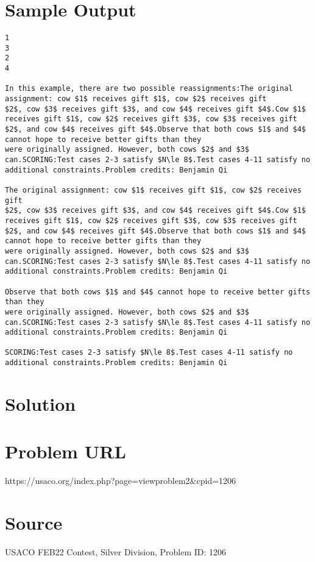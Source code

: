 \documentclass[12pt]{article}
\begin{document}
\section*{Sample Output}
\begin{verbatim}
1
3
2
4

In this example, there are two possible reassignments:The original assignment: cow $1$ receives gift $1$, cow $2$ receives gift
$2$, cow $3$ receives gift $3$, and cow $4$ receives gift $4$.Cow $1$ receives gift $1$, cow $2$ receives gift $3$, cow $3$ receives gift
$2$, and cow $4$ receives gift $4$.Observe that both cows $1$ and $4$ cannot hope to receive better gifts than they
were originally assigned. However, both cows $2$ and $3$ can.SCORING:Test cases 2-3 satisfy $N\le 8$.Test cases 4-11 satisfy no additional constraints.Problem credits: Benjamin Qi

The original assignment: cow $1$ receives gift $1$, cow $2$ receives gift
$2$, cow $3$ receives gift $3$, and cow $4$ receives gift $4$.Cow $1$ receives gift $1$, cow $2$ receives gift $3$, cow $3$ receives gift
$2$, and cow $4$ receives gift $4$.Observe that both cows $1$ and $4$ cannot hope to receive better gifts than they
were originally assigned. However, both cows $2$ and $3$ can.SCORING:Test cases 2-3 satisfy $N\le 8$.Test cases 4-11 satisfy no additional constraints.Problem credits: Benjamin Qi

Observe that both cows $1$ and $4$ cannot hope to receive better gifts than they
were originally assigned. However, both cows $2$ and $3$ can.SCORING:Test cases 2-3 satisfy $N\le 8$.Test cases 4-11 satisfy no additional constraints.Problem credits: Benjamin Qi

SCORING:Test cases 2-3 satisfy $N\le 8$.Test cases 4-11 satisfy no additional constraints.Problem credits: Benjamin Qi
\end{verbatim}

\section*{Solution}


\section*{Problem URL}
https://usaco.org/index.php?page=viewproblem2&cpid=1206

\section*{Source}
USACO FEB22 Contest, Silver Division, Problem ID: 1206
\end{document}
